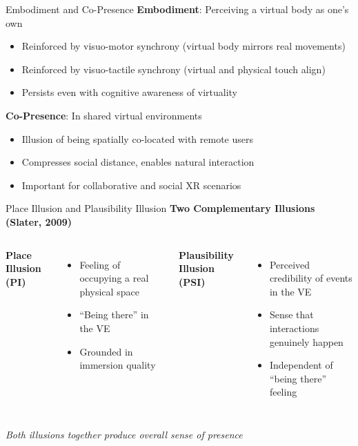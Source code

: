 \begin{frame}{Embodiment and Co-Presence}
	\textbf{\textcolor{gbAqua}{Embodiment}}: Perceiving a virtual body as one's own
	
	\begin{itemize}
		\item Reinforced by visuo-motor synchrony (virtual body mirrors real movements)
		\item Reinforced by visuo-tactile synchrony (virtual and physical touch align)
		\item Persists even with cognitive awareness of virtuality
	\end{itemize}
	
	\vspace{0.3cm}
	
	\textbf{\textcolor{gbAqua}{Co-Presence}}: In shared virtual environments
	
	\begin{itemize}
		\item Illusion of being spatially co-located with remote users
		\item Compresses social distance, enables natural interaction
		\item Important for collaborative and social XR scenarios
	\end{itemize}
	
\end{frame}

\begin{frame}{Place Illusion and Plausibility Illusion}
	\textbf{\textcolor{gbAqua}{Two Complementary Illusions (Slater, 2009)}}
	
	\vspace{0.3cm}
	
	\begin{columns}[t]
		\textbf{Place Illusion (PI)}
		
		\begin{itemize}
			\item Feeling of occupying a real physical space
			\item ``Being there'' in the VE
			\item Grounded in immersion quality
		\end{itemize}
		
		\textbf{Plausibility Illusion (PSI)}
		
		\begin{itemize}
			\item Perceived credibility of events in the VE
			\item Sense that interactions genuinely happen
			\item Independent of ``being there'' feeling
		\end{itemize}
	\end{columns}
	
	\vspace{0.3cm}
	
	\textit{Both illusions together produce overall sense of presence}
	
\end{frame}

